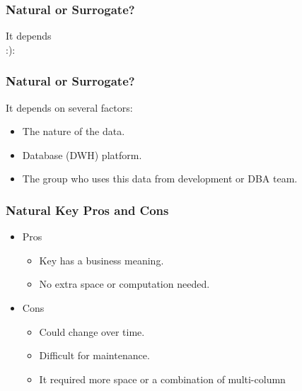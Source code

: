 \begin{frame}
	\frametitle{Natural or Surrogate?}
	\vspace{2.6cm}
\begin{center}
	\hspace{1.5cm}	{\Huge It depends \\
	\hspace{1.5cm}			:):}
\end{center}
\end{frame}
\begin{frame}
	\frametitle{Natural or Surrogate?}
	\vspace{1cm}
	It depends on several factors:
		\begin{itemize}[<+->]
			\item The nature of the data.
			\item Database (DWH) platform.
			\item The group who uses this data from development or DBA team.		
		\end{itemize}		
\end{frame}
\begin{frame}
	\frametitle{Natural Key Pros and Cons}

	\hspace{.5cm}
	\begin{itemize}
		\item	Pros
		\begin{itemize}
			\item Key has a business meaning.
			\item No extra space or computation needed.
		\end{itemize}	
	\end{itemize}

\begin{itemize}
		\item	Cons
		\begin{itemize}
			\item Could change over time.
			\item Difficult for maintenance.
			\item It required more space or a combination of multi-column
		\end{itemize}	
	\end{itemize}	

\end{frame}
